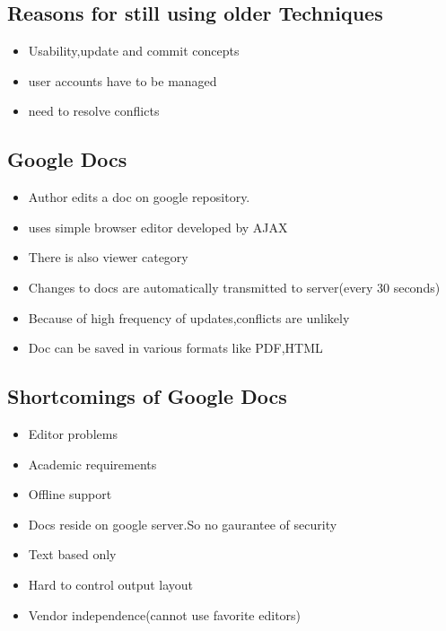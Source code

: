  
 
 
 
 


\subsection{Reasons for still using older Techniques}
\begin{itemize}
\item Usability,update and commit concepts
\item user accounts have to be managed
\item need to resolve conflicts
\end{itemize}

\subsection{Google Docs}
\begin{itemize}
 
 \item  Author edits a doc on google repository.
 \item  uses simple browser editor developed by AJAX
 \item  There is also viewer category
 \item  Changes to docs are automatically transmitted to server(every 30 seconds)
 \item  Because of high frequency of updates,conflicts are unlikely
 \item  Doc can be saved in various formats like PDF,HTML
\end{itemize}


\subsection{Shortcomings of Google Docs}\cite{2006}


\begin{itemize}
  \item Editor problems
 \item Academic requirements
 \item Offline support
 \item Docs reside on google server.So no gaurantee of security
 \item Text based only
 \item Hard to control output layout
 \item Vendor independence(cannot use favorite editors)
\end{itemize}



